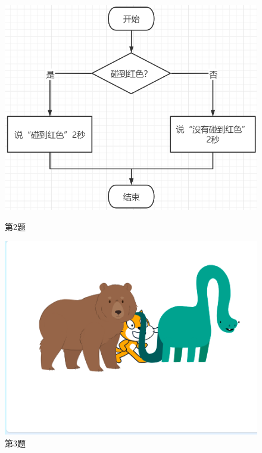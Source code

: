 \documentclass[10pt, a4paper]{article}
\begin{document}
\begin{enumerate}
\begin{figure}[htbp]
\begin{minipage}[t]{.5\textwidth}
\begin{minipage}[t]{.45\textwidth}
                \end{minipage}
                \begin{minipage}[t]{.53\textwidth}
                    \centering
                    \includegraphics[width=\textwidth]{2-2.png}
                \end{minipage}
                \caption*{第2题}
            \end{minipage}
            \begin{minipage}[t]{.23\textwidth}
                \centering
                \includegraphics[width=\textwidth]{3.png}
                \caption*{第3题}
            \end{minipage}
        \end{figure}


\end{enumerate}
\end{document}
